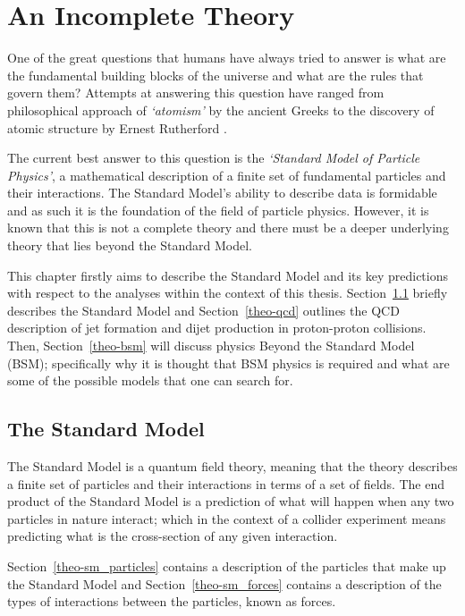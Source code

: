 \chapter{An Incomplete Theory}
\label{sec:theo}

One of the great questions that humans have always tried to answer is
what are the fundamental building blocks of the universe and what are the rules that govern them?
Attempts at answering this question have ranged from
philosophical approach of \textit{`atomism'} by the ancient Greeks \cite{theo-atomism}
to the discovery of atomic structure by Ernest Rutherford \cite{theo-rutherford}.

The current best answer to this question is the \textit{`Standard Model of Particle Physics'},
a mathematical description of a finite set of fundamental particles and their interactions.
The Standard Model's ability to describe data is formidable
and as such it is the foundation of the field of particle physics. 
However, it is known that this is not a complete theory and there must be
a deeper underlying theory that lies beyond the Standard Model.

This chapter firstly aims to describe the Standard Model and its key predictions
with respect to the analyses within the context of this thesis.
Section~\ref{theo-sm} briefly describes the Standard Model and
Section~\ref{theo-qcd} outlines the QCD description of jet formation and dijet production in proton-proton collisions.
Then, Section~\ref{theo-bsm} will discuss physics Beyond the Standard Model (BSM);
specifically why it is thought that BSM physics is required
and what are some of the possible models that one can search for.

\newpage
\section{The Standard Model}
\label{theo-sm}

The Standard Model is a quantum field theory,
meaning that the theory describes a finite set of particles and their interactions in
terms of a set of fields.
The end product of the Standard Model is a prediction
of what will happen when any two particles in nature interact;
which in the context of a collider experiment means predicting what is the cross-section of any given interaction.

Section~\ref{theo-sm_particles} contains a description of the particles that make up the Standard Model 
and Section~\ref{theo-sm_forces} contains a description of the types of interactions between the particles, known as forces.

